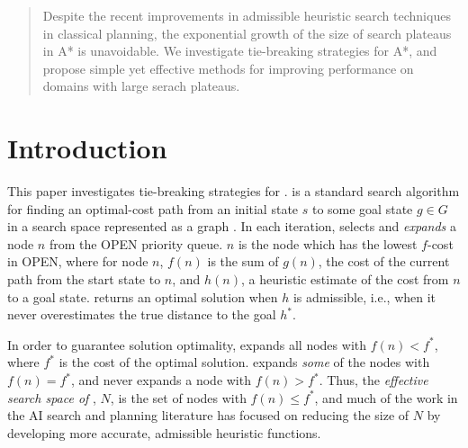 

\begin{abstract}
Despite the recent improvements in admissible heuristic search techniques
in classical planning, the exponential growth of
the size of search plateaus in A* is unavoidable.
We investigate tie-breaking strategies for A*, and propose simple yet effective methods for improving performance on domains with large serach plateaus.

\end{abstract}

\section{Introduction}
\label{sec-1}




This paper investigates tie-breaking strategies for \astar.
\astar is a standard search algorithm for finding an optimal-cost path 
from an initial state $s$ to some goal state $g \in G$ in a search space represented as a graph \cite{hart1968formal}.
In each iteration, \astar selects and \emph{expands} a node $n$ from the OPEN priority queue.
$n$ is the node which has the lowest $f$-cost in OPEN, where for node $n$, $f(n)$ is the sum of  $g(n)$, the cost of the current path from the start state to $n$, and $h(n)$, a heuristic estimate of the cost from $n$ to a goal state.
\astar returns an optimal solution when $h$ is admissible, i.e., when it
never overestimates the true distance to the goal $h^*$.

In order to guarantee solution optimality, \astar expands all
nodes with $f(n) < f^*$, where $f^*$ is the cost of the optimal solution.
\astar expands \emph{some} of the nodes with $f(n) = f^*$, and never expands a node with $f(n) > f^*$.
Thus, the \emph{effective search space of \astar}, $N$, is the set of nodes with 
$f(n) \leq f^*$, and
much of the work in the AI search and planning literature  has focused on reducing the size of $N$ by
developing more accurate, admissible heuristic functions.

